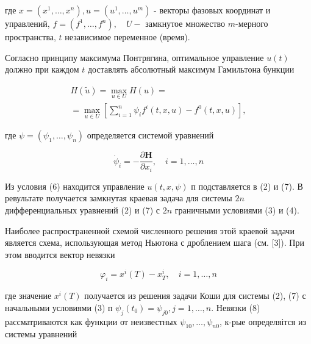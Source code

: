 \documentclass[10pt]{article}
\begin{document}
где $x=\left(x^{1}, \ldots, x^{n}\right), u=\left(u^{1}, \ldots, u^{m}\right)$ - векторы фазовых координат и управлений, $f=\left(f^{1}, \ldots, f^{n}\right), \quad U-$ замкнутое множество $m$-мерного пространства, $t$ независимое переменное (время).



Согласно принципу максимума Понтрягина, оптимальное управление $u(t)$ должно при каждом $t$ доставлять абсолютный максимум Гамильтона бункции



\[

\begin{gathered}

H(\tilde{u})=\max _{u \in U} H(u)= \\

=\max _{u \in U}\left[\sum_{i=1}^{n} \psi_{i} f^{i}(t, x, u)-f^{0}(t, x, u)\right],

\end{gathered}

\]



где $\psi=\left(\psi_{1}, \ldots, \psi_{n}\right)$ определяется системой уравнений



\[

\dot{\psi}_{i}=-\frac{\partial \boldsymbol{H}}{\partial x_{i}}, \quad i=1, \ldots, n

\]



Из условия (6) находится управление $u(t, x, \psi)$ п подставляется в (2) и (7). В ревультате получается замкнутая краевая задача для системы $2 n$ дифференциальных уравнений (2) и (7) с $2 n$ граничными условиями (3) и (4).



Наиболее распространенной схемой численного решения этой краевой задачи является схема, использующая метод Ньютона с дроблением шага (см. [3]). При этом вводится вектор невязки



\[

\varphi_{i}=x^{i}(T)-x_{T}^{i}, \quad i=1, \ldots, n

\]



где значение $x^{i}(T)$ получается из решения задачи Коши для системы (2), (7) с начальными условиями (3) п $\psi_{j}\left(t_{0}\right)=\psi_{j 0}, j=1, \ldots, n$. Невязки (8) рассматриваются как функции от неизвестных $\psi_{10}, \ldots, \psi_{n 0}$, к-рые определяітся из системы уравнений
\end{document}
